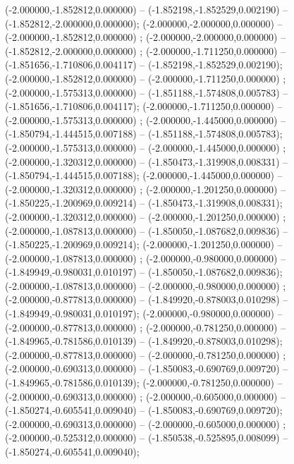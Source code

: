  (-2.000000,-1.852812,0.000000) -- (-1.852198,-1.852529,0.002190) -- (-1.852812,-2.000000,0.000000);
 (-2.000000,-2.000000,0.000000) -- (-2.000000,-1.852812,0.000000) ;
 (-2.000000,-2.000000,0.000000) -- (-1.852812,-2.000000,0.000000) ;
 (-2.000000,-1.711250,0.000000) -- (-1.851656,-1.710806,0.004117) -- (-1.852198,-1.852529,0.002190);
 (-2.000000,-1.852812,0.000000) -- (-2.000000,-1.711250,0.000000) ;
 (-2.000000,-1.575313,0.000000) -- (-1.851188,-1.574808,0.005783) -- (-1.851656,-1.710806,0.004117);
 (-2.000000,-1.711250,0.000000) -- (-2.000000,-1.575313,0.000000) ;
 (-2.000000,-1.445000,0.000000) -- (-1.850794,-1.444515,0.007188) -- (-1.851188,-1.574808,0.005783);
 (-2.000000,-1.575313,0.000000) -- (-2.000000,-1.445000,0.000000) ;
 (-2.000000,-1.320312,0.000000) -- (-1.850473,-1.319908,0.008331) -- (-1.850794,-1.444515,0.007188);
 (-2.000000,-1.445000,0.000000) -- (-2.000000,-1.320312,0.000000) ;
 (-2.000000,-1.201250,0.000000) -- (-1.850225,-1.200969,0.009214) -- (-1.850473,-1.319908,0.008331);
 (-2.000000,-1.320312,0.000000) -- (-2.000000,-1.201250,0.000000) ;
 (-2.000000,-1.087813,0.000000) -- (-1.850050,-1.087682,0.009836) -- (-1.850225,-1.200969,0.009214);
 (-2.000000,-1.201250,0.000000) -- (-2.000000,-1.087813,0.000000) ;
 (-2.000000,-0.980000,0.000000) -- (-1.849949,-0.980031,0.010197) -- (-1.850050,-1.087682,0.009836);
 (-2.000000,-1.087813,0.000000) -- (-2.000000,-0.980000,0.000000) ;
 (-2.000000,-0.877813,0.000000) -- (-1.849920,-0.878003,0.010298) -- (-1.849949,-0.980031,0.010197);
 (-2.000000,-0.980000,0.000000) -- (-2.000000,-0.877813,0.000000) ;
 (-2.000000,-0.781250,0.000000) -- (-1.849965,-0.781586,0.010139) -- (-1.849920,-0.878003,0.010298);
 (-2.000000,-0.877813,0.000000) -- (-2.000000,-0.781250,0.000000) ;
 (-2.000000,-0.690313,0.000000) -- (-1.850083,-0.690769,0.009720) -- (-1.849965,-0.781586,0.010139);
 (-2.000000,-0.781250,0.000000) -- (-2.000000,-0.690313,0.000000) ;
 (-2.000000,-0.605000,0.000000) -- (-1.850274,-0.605541,0.009040) -- (-1.850083,-0.690769,0.009720);
 (-2.000000,-0.690313,0.000000) -- (-2.000000,-0.605000,0.000000) ;
 (-2.000000,-0.525312,0.000000) -- (-1.850538,-0.525895,0.008099) -- (-1.850274,-0.605541,0.009040);
